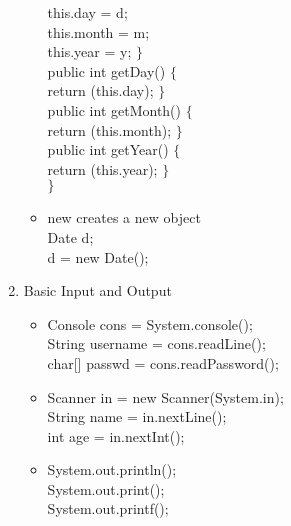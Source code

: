\documentclass[a4paper]{article}
\begin{document}
\begin{enumerate}
\begin{itemize}
        this.day = d;\\
        this.month = m;\\
        this.year = y;
        $\}$\\
        public int getDay() $\{$\\
        return (this.day);
        $\}$\\
        public int getMonth() $\{$\\
        return (this.month);
        $\}$\\
        public int getYear() $\{$\\
        return (this.year);
        $\}$\\
        $\}$
        \item new creates a new object\\
        Date d;\\
        d = new Date();
    \end{itemize}
    \item Basic Input and Output
    \begin{itemize}
        \item Console cons = System.console();\\
        String username = cons.readLine();\\
        char[] passwd = cons.readPassword();
        \item Scanner in = new Scanner(System.in);\\
        String name = in.nextLine();\\
        int age = in.nextInt();
        \item System.out.println();\\
        System.out.print();\\
        System.out.printf();
    \end{itemize}
\end{enumerate}
\end{document}
